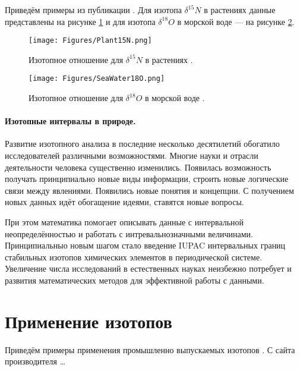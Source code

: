 \documentclass[a5paper,openany]{book}
\begin{document}
Приведём примеры из публикации \cite{Bowen2010}. Для изотопа  $\delta^{15}N$ в растениях данные представлены на рисунке \ref{f:Plant15N} и для изотопа  $\delta^{18}O$ в морской воде --- на рисунке \ref{f:SeaWater18O}.
\begin{figure}[ht] 
\centering\small
\unitlength=1mm
{\texttt{[image: Figures/Plant15N.png]}} 
\caption{Изотопное отношение для $\delta^{15}N$ в растениях \cite{Bowen2010}.} 
\label{f:Plant15N}
\end{figure}


\begin{figure}[ht] 
\centering\small
\unitlength=1mm
{\texttt{[image: Figures/SeaWater18O.png]}} 
\caption{Изотопное отношение для  $\delta^{18}O$ в морской воде \cite{Bowen2010}.} 
\label{f:SeaWater18O}
\end{figure}

\paragraph{Изотопные интервалы в природе.}

Развитие изотопного анализа в последние несколько десятилетий обогатило исследователей различными возможностями. Многие науки и отрасли деятельности человека существенно изменились. Появилась возможность получать принципиально новые виды информации, строить новые логические связи между явлениями. Появились новые понятия  и концепции. С получением новых данных идёт обогащение идеями, ставятся новые вопросы.

При этом математика помогает описывать данные с интервальной неопределённостью  и работать с интревальнозначными величинами. Принципиальныо новым шагом стало введение IUPAC интервальных границ стабильных изотопов химических элементов в периодической системе.  Увеличение числа исследований в естественных науках неизбежно потребует и развития математических методов для  эффективной работы с данными. 




\section{Применение изотопов}\label{IsotopeApplications}

Приведём примеры применения промышленно выпускаемых изотопов \cite{isotopes-use}.
С сайта производителя \ldots
\end{document}
